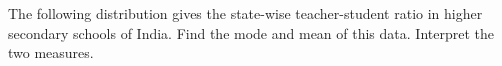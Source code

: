 \begin{flushleft}
The following distribution gives the state-wise teacher-student ratio in higher
secondary schools of India. Find the mode and mean of this data. Interpret the two
measures.
\end{flushleft}

\begin{table}[ht!]
\centering

\end{table} 

